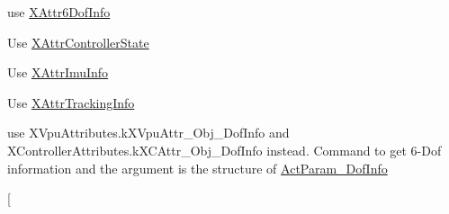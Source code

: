 
\begin{DoxyRefList}
\item[\label{deprecated__deprecated000001}%
\Hypertarget{deprecated__deprecated000001}%
Class \mbox{\hyperlink{struct_ximmerse_1_1_input_system_1_1_x_device_plugin_1_1_act_param__6_dof_info}{Ximmerse.Input\+System.X\+Device\+Plugin.Act\+Param\+\_\+6\+Dof\+Info}} ]use \mbox{\hyperlink{struct_ximmerse_1_1_input_system_1_1_x_device_plugin_1_1_x_attr6_dof_info}{X\+Attr6\+Dof\+Info}}  
\item[\label{deprecated__deprecated000004}%
\Hypertarget{deprecated__deprecated000004}%
Class \mbox{\hyperlink{struct_ximmerse_1_1_input_system_1_1_x_device_plugin_1_1_act_param___controller_state}{Ximmerse.Input\+System.X\+Device\+Plugin.Act\+Param\+\_\+\+Controller\+State}} ]Use \mbox{\hyperlink{struct_ximmerse_1_1_input_system_1_1_x_device_plugin_1_1_x_attr_controller_state}{X\+Attr\+Controller\+State}}  
\item[\label{deprecated__deprecated000002}%
\Hypertarget{deprecated__deprecated000002}%
Class \mbox{\hyperlink{struct_ximmerse_1_1_input_system_1_1_x_device_plugin_1_1_act_param___i_m_u_info}{Ximmerse.Input\+System.X\+Device\+Plugin.Act\+Param\+\_\+\+I\+M\+U\+Info}} ]Use \mbox{\hyperlink{struct_ximmerse_1_1_input_system_1_1_x_device_plugin_1_1_x_attr_imu_info}{X\+Attr\+Imu\+Info}}  
\item[\label{deprecated__deprecated000003}%
\Hypertarget{deprecated__deprecated000003}%
Class \mbox{\hyperlink{struct_ximmerse_1_1_input_system_1_1_x_device_plugin_1_1_act_param___marker_info}{Ximmerse.Input\+System.X\+Device\+Plugin.Act\+Param\+\_\+\+Marker\+Info}} ]Use \mbox{\hyperlink{struct_ximmerse_1_1_input_system_1_1_x_device_plugin_1_1_x_attr_tracking_info}{X\+Attr\+Tracking\+Info}}  
\item[\label{deprecated__deprecated000027}%
\Hypertarget{deprecated__deprecated000027}%
Member \mbox{\hyperlink{class_ximmerse_1_1_input_system_1_1_x_device_plugin_ab7f817a86e5b3af956089fb089b7d0c3a8b16f0e3686bd02934286fd2981949e8}{Ximmerse.Input\+System.X\+Device\+Plugin.k\+X\+Act\+\_\+\+Get6\+Dof\+Info}} ]use X\+Vpu\+Attributes.\+k\+X\+Vpu\+Attr\+\_\+\+Obj\+\_\+Dof\+Info and X\+Controller\+Attributes.\+k\+X\+C\+Attr\+\_\+\+Obj\+\_\+Dof\+Info instead. Command to get 6-\/\+Dof information and the argument is the structure of \mbox{\hyperlink{struct_ximmerse_1_1_input_system_1_1_x_device_plugin_1_1_act_param__6_dof_info}{Act\+Param\+\_\+Dof\+Info}}  
\item[\label{deprecated__deprecated000028}%
%

\end{DoxyRefList}
